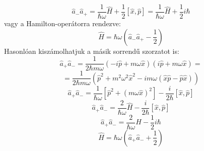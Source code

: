 \documentclass[../main.tex]{subfiles}
\begin{document}
\begin{equation}
    \hat{a}_- \hat{a}_+ = \frac{1}{\hbar \omega} \hat{H} + \frac{1}{2} [\hat{x}, \hat{p}] = \frac{1}{\hbar \omega} \hat{H} + \frac{1}{2} i \hbar
\end{equation}
vagy a Hamilton-operátorra rendezve:
\begin{equation}
    \hat{H} = \hbar \omega \left( \hat{a}_- \hat{a}_+ - \frac{1}{2} \right)
\end{equation}
Hasonlóan kiszámolhatjuk a másik sorrendű szorzatot is:
\begin{equation}
    \hat{a}_+ \hat{a}_- = \frac{1}{2 \hbar m \omega} \left( - i \hat{p} + m \omega \hat{x} \right) \left( i \hat{p} + m \omega \hat{x} \right) = 
\end{equation}
\begin{equation}
    = \frac{1}{2 \hbar m \omega} \left( \hat{p}^2 + m^2 \omega^2 \hat{x}^2 - i m \omega (\hat{x} \hat{p} - \hat{p} \hat{x}) \right)
\end{equation}
\begin{equation}
    \hat{a}_+ \hat{a}_- = \frac{1}{\hbar \omega} \left[\hat{p}^2 + (m \omega \hat{x})^2\right] - \frac{i}{2 \hbar} [\hat{x}, \hat{p}]
\end{equation}
\begin{equation}
    \hat{a}_+ \hat{a}_- = \frac{2}{\hbar \omega} \hat{H} - \frac{i}{2 \hbar} [\hat{x}, \hat{p}]
\end{equation}
\begin{equation}
    \hat{a}_+ \hat{a}_- = \frac{2}{\hbar \omega} \hat{H} - \frac{1}{2} i \hbar
\end{equation}
\begin{equation}
    \hat{H} = \hbar \omega \left( \hat{a}_+ \hat{a}_- + \frac{1}{2} \right)
\end{equation}
\end{document}
